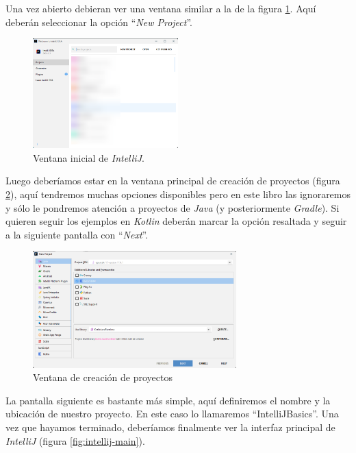     Una vez abierto debieran ver una ventana similar a la de la figura \ref{fig:intellij-landing}.
    Aquí deberán seleccionar la opción \enquote{\textit{New Project}}.

    \begin{figure}[ht!]
      \centering
      \includegraphics[width=0.5\textwidth]{img/Por_algo_se_empieza/idea64_HkClRzeuYD.png}
      \caption{Ventana inicial de \textit{IntelliJ}.}
      \label{fig:intellij-landing}
    \end{figure}

    Luego deberíamos estar en la ventana principal de creación de proyectos (figura 
    \ref{fig:intellij-new-project-1}), aquí tendremos muchas opciones disponibles pero en este
    libro las ignoraremos y sólo le pondremos atención a proyectos de \textit{Java} (y 
    posteriormente \textit{Gradle}).
    Si quieren seguir los ejemplos en \textit{Kotlin} deberán marcar la opción resaltada y seguir
    a la siguiente pantalla con \enquote{\textit{Next}}.

    \begin{figure}[ht!]
      \centering
      \includegraphics[width=0.7\textwidth]{img/Por_algo_se_empieza/idea64_new_project_1.png}
      \caption{Ventana de creación de proyectos}
      \label{fig:intellij-new-project-1}
    \end{figure}

    La pantalla siguiente es bastante más simple, aquí definiremos el nombre y la ubicación de 
    nuestro proyecto.
    En este caso lo llamaremos \enquote{IntelliJBasics}.
    Una vez que hayamos terminado, deberíamos finalmente ver la interfaz principal de 
    \textit{IntelliJ} (figura \ref{fig:intellij-main}).

